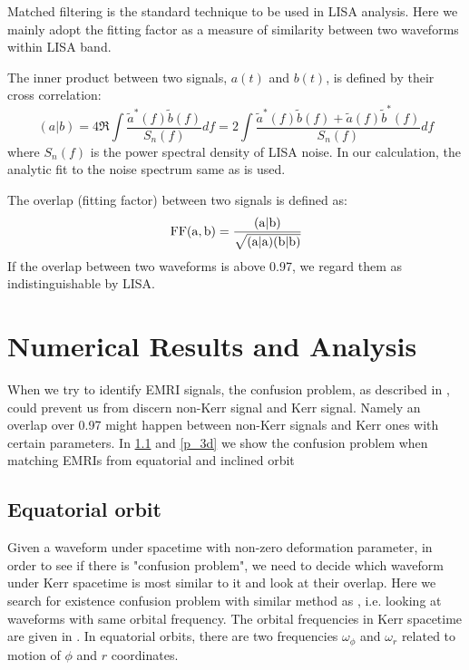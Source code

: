 \documentclass{article}
\begin{document}
Matched filtering is the standard technique to be used in LISA analysis. Here we mainly adopt the fitting factor as  a measure of similarity between two waveforms within LISA band. 

The inner product between two signals, $a(t)$ and $b(t)$, is defined by their cross correlation: \cite{product}
\begin{equation}
	(a|b)=4\Re\int \frac{\tilde{a}^*(f) \tilde{b}(f)}{S_n(f)}df =2\int \frac{\tilde{a}^*(f) \tilde{b}(f) +\tilde{a}(f) \tilde{b}^*(f) }{S_n(f)}df
\end{equation}
where $S_n(f)$ is the power spectral density of LISA noise. In our calculation, the analytic fit to the noise spectrum same as \cite{kludge} is used.

The overlap (fitting factor) between two signals is defined as:
\begin{equation}
	\rm {FF}(a,b)=\frac{(a|b)}{\sqrt{(a|a)(b|b)}}
\end{equation}
If the overlap between two waveforms is above 0.97, we regard them as indistinguishable by LISA.

\section{Numerical Results and Analysis}
\label{p_conf}
When we try to identify EMRI signals, the confusion problem, as described in \cite{sameOmg}, could prevent us from discern non-Kerr signal and Kerr signal. Namely an overlap over 0.97 might happen between non-Kerr signals and Kerr ones with certain parameters. In \ref{p_2d} and \ref{p_3d} we show the confusion problem when matching EMRIs from equatorial and inclined orbit 
\subsection{Equatorial orbit}
\label{p_2d}
Given a waveform under spacetime with non-zero deformation parameter, in order to see if there is "confusion problem", we need to decide which waveform under Kerr spacetime is most similar to it and look at their overlap. Here we search for existence confusion problem with similar method as \cite{majorPRD}, i.e. looking at waveforms with same orbital frequency. The orbital frequencies in Kerr spacetime are given in \cite{tauOmg}. In equatorial orbits, there are two frequencies $\omega_\phi$ and $\omega_r$ related to motion of $\phi$ and $r$ coordinates.
\end{document}
